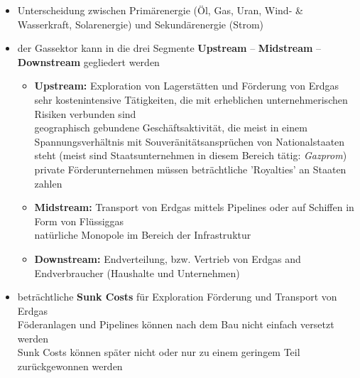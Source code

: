 \documentclass[11pt,a4paper]{article}
\begin{document}
\begin{itemize}

\item Unterscheidung zwischen Primärenergie (Öl, Gas, Uran, Wind- \& Wasserkraft, Solarenergie) und Sekundärenergie (Strom)

\item der Gassektor kann in die drei Segmente \textbf{Upstream} -- \textbf{Midstream} -- \textbf{Downstream} gegliedert werden

	\begin{itemize}
	\item \textbf{Upstream:} Exploration von Lagerstätten und Förderung von Erdgas\\
	 sehr kostenintensive Tätigkeiten, die mit erheblichen unternehmerischen Risiken verbunden sind\\
	 geographisch gebundene Geschäftsaktivität, die meist in einem Spannungsverhältnis mit Souveränitätsansprüchen von Nationalstaaten steht (meist sind Staatsunternehmen in diesem Bereich tätig: \textsl{Gazprom})\\
	 private Förderunternehmen müssen beträchtliche 'Royalties' an Staaten zahlen

	\vspace{1cm}

	\item \textbf{Midstream:} Transport von Erdgas mittels Pipelines oder auf Schiffen in Form von Flüssiggas\\
	 natürliche Monopole im Bereich der Infrastruktur

	\vspace{1cm}

	\item \textbf{Downstream:} Endverteilung, bzw. Vertrieb von Erdgas and Endverbraucher (Haushalte und Unternehmen)

	\vspace{1cm}

	\end{itemize}

\item beträchtliche \textbf{Sunk Costs} für Exploration Förderung und Transport von Erdgas\\
 Föderanlagen und Pipelines können nach dem Bau nicht einfach versetzt werden\\
 Sunk Costs können später nicht oder nur zu einem geringem Teil zurückgewonnen werden\\


\end{itemize}
\end{document}
